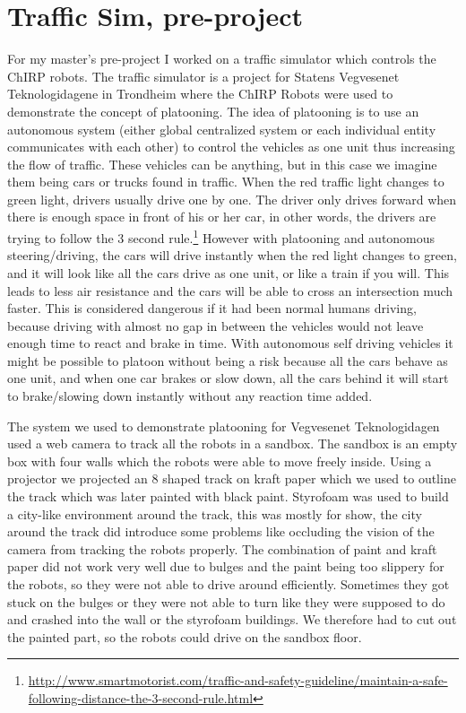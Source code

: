 \section{Traffic Sim, pre-project}
For my master's pre-project I worked on a traffic simulator which controls the ChIRP robots.
The traffic simulator is a project for Statens Vegvesenet Teknologidagene in Trondheim where the ChIRP Robots were used to demonstrate the concept of platooning. 
The idea of platooning is to use an autonomous system (either global centralized system or each individual entity communicates with each other) to control the vehicles as one unit thus increasing the flow of traffic. These vehicles can be anything, but in this case we imagine them being cars or trucks found in traffic. When the red traffic light changes to green light, drivers usually drive one by one. The driver only drives forward when there is enough space in front of his or her car, in other words, the drivers are trying to follow the 3 second rule.\footnote{\href{http://www.smartmotorist.com/traffic-and-safety-guideline/maintain-a-safe-following-distance-the-3-second-rule.html}{http://www.smartmotorist.com/traffic-and-safety-guideline/maintain-a-safe-following-distance-the-3-second-rule.html}}
However with platooning and autonomous steering/driving, the cars will drive instantly when the red light changes to green, and it will look like all the cars drive as one unit, or like a train if you will.
This leads to less air resistance and the cars will be able to cross an intersection much faster. This is considered dangerous if it had been normal humans driving, because driving with almost no gap in between the vehicles would not leave enough time to react and brake in time. With autonomous self driving vehicles it might be possible to platoon without being a risk because all the cars behave as one unit, and when one car brakes or slow down, all the cars behind it will start to brake/slowing down instantly without any reaction time added.

The system we used to demonstrate platooning for Vegvesenet Teknologidagen used a web camera to track all the robots in a sandbox. The sandbox is an empty box with four walls which the robots were able to move freely inside. Using a projector we projected an 8 shaped track on kraft paper which we used to outline the track which was later painted with black paint. Styrofoam was used to build a city-like environment around the track, this was mostly for show, the city around the track did introduce some problems like occluding the vision of the camera from tracking the robots properly.
The combination of paint and kraft paper did not work very well due to bulges and the paint being too slippery for the robots, so they were not able to drive around efficiently. Sometimes they got stuck on the bulges or they were not able to turn like they were supposed to do and crashed into the wall or the styrofoam buildings.  We therefore had to cut out the painted part, so the robots could drive on the sandbox floor.


